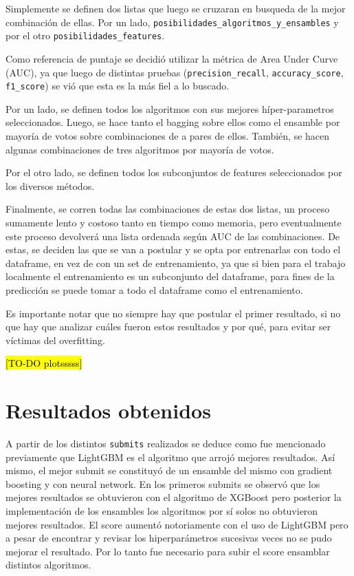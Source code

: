 \documentclass[a4paper]{article}
\begin{document}
Simplemente se definen dos listas que luego se cruzaran en busqueda de la mejor combinación de ellas. Por un lado, \texttt{posibilidades\_algoritmos\_y\_ensambles} y por el otro \texttt{posibilidades\_features}.

Como referencia de puntaje se decidió utilizar la métrica de Area Under Curve (AUC), ya que luego de distintas pruebas (\texttt{precision\_recall}, \texttt{accuracy\_score}, \texttt{f1\_score}) se vió que esta es la más fiel a lo buscado.

Por un lado, se definen todos los algoritmos con sus mejores híper-parametros seleccionados. Luego, se hace tanto el bagging sobre ellos como el ensamble por mayoría de votos sobre combinaciones de a pares de ellos. También, se hacen algunas combinaciones de tres algoritmos por mayoría de votos.

Por el otro lado, se definen todos los subconjuntos de features seleccionados por los diversos métodos.

Finalmente, se corren todas las combinaciones de estas dos listas, un proceso sumamente lento y costoso tanto en tiempo como memoria, pero eventualmente este proceso devolverá una lista ordenada según AUC de las combinaciones. De estas, se deciden las que se van a postular y se opta por entrenarlas con todo el dataframe, en vez de con un set de entrenamiento, ya que si bien para el trabajo localmente el entrenamiento es un subconjunto del dataframe, para fines de la predicción se puede tomar a todo el dataframe como el entrenamiento.

Es importante notar que no siempre hay que postular el primer resultado, si no que hay que analizar cuáles fueron estos resultados y por qué, para evitar ser víctimas del overfitting. 

\hl{[TO-DO plotsssss]}

\section{Resultados obtenidos}

A partir de los distintos \texttt{submits} realizados se deduce como fue mencionado previamente que LightGBM es el algoritmo que arrojó mejores resultados. Así mismo, el mejor submit se constituyó de un ensamble del mismo con gradient boosting y con neural network. En los primeros submits se observó que los mejores resultados se obtuvieron con el algoritmo de XGBoost pero posterior la implementación de los ensambles los algoritmos por sí solos no obtuvieron mejores resultados. El score aumentó notoriamente con el uso de LightGBM pero a pesar de encontrar y revisar los hiperparámetros sucesivas veces no se pudo mejorar el resultado. Por lo tanto fue necesario para subir el score ensamblar distintos algoritmos.
\end{document}

